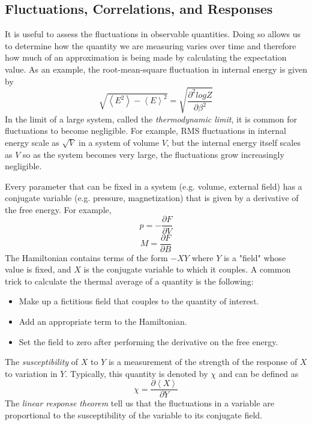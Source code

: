 \documentclass{article}
\begin{document}
\subsection{Fluctuations, Correlations, and Responses}
It is useful to assess the fluctuations in observable quantities. Doing so
allows us to determine how the quantity we are measuring varies over time and
therefore how much of an approximation is being made by calculating the expectation
value. As an example, the root-mean-square fluctuation in internal energy is given by
$$\sqrt{\left \langle E^{2} \right \rangle - \left \langle E \right \rangle^{2}} = \sqrt{\frac{\partial^{2}log Z}{\partial \beta^{2}}}$$
In the limit of a large system, called the \emph{thermodynamic limit}, it is common for
fluctuations to become negligible. For example, RMS fluctuations in internal energy scale
as $\sqrt{V}$ in a system of volume $V$, but the internal energy itself scales as $V$
so as the system becomes very large, the fluctuations grow increasingly
negligible.

Every parameter that can be fixed in a system (e.g. volume, external field)
has a conjugate variable (e.g. pressure, magnetization) that is given by a
derivative of the free energy. For example,
$$ p = -\frac{\partial F}{\partial V}$$
$$ M = \frac{\partial F}{\partial B}$$
The Hamiltonian contains terms of the form $-XY$ where $Y$ is a "field" whose
value is fixed, and $X$ is the conjugate variable to which it couples.
A common trick to calculate the thermal average of a quantity is the following:
\begin{itemize}
\item Make up a fictitious field that couples to the quantity of interest.
\item Add an appropriate term to the Hamiltonian.
\item Set the field to zero after performing the derivative on the free energy.
\end{itemize}
The \emph{susceptibility} of $X$ to $Y$ is a measurement of the strength of
the response of $X$ to variation in $Y$. Typically, this quantity is denoted
by $\chi$ and can be defined as
$$\chi = \frac{\partial \left \langle X \right \rangle  }{\partial Y}$$
The \emph{linear response theorem} tell us that the fluctuations in a variable
are proportional to the susceptibility of the variable to its conjugate field.
\end{document}
